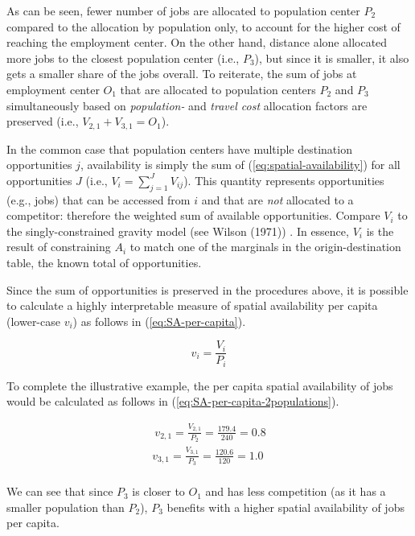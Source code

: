 \documentclass[]{elsarticle} %
\begin{document}
As can be seen, fewer number of jobs are allocated to population center
\(P_2\) compared to the allocation by population only, to account for
the higher cost of reaching the employment center. On the other hand,
distance alone allocated more jobs to the closest population center
(i.e., \(P_3\)), but since it is smaller, it also gets a smaller share
of the jobs overall. To reiterate, the sum of jobs at employment center
\(O_1\) that are allocated to population centers \(P_2\) and \(P_3\)
simultaneously based on \emph{population-} and \emph{travel cost}
allocation factors are preserved (i.e., \(V_{2,1} + V_{3,1} = O_1\)).

In the common case that population centers have multiple destination
opportunities \(j\), availability is simply the sum of
(\ref{eq:spatial-availability}) for all opportunities \(J\) (i.e.,
\(V_i = \sum_{j=1}^J V_{ij}\)). This quantity represents opportunities
(e.g., jobs) that can be accessed from \(i\) and that are \emph{not}
allocated to a competitor: therefore the weighted sum of available
opportunities. Compare \(V_i\) to the singly-constrained gravity model
(see Wilson (1971)) . In essence, \(V_i\) is the result of constraining
\(A_i\) to match one of the marginals in the origin-destination table,
the known total of opportunities.

Since the sum of opportunities is preserved in the procedures above, it
is possible to calculate a highly interpretable measure of spatial
availability per capita (lower-case \(v_i\)) as follows in
(\ref{eq:SA-per-capita}).

\begin{equation}
\label{eq:SA-per-capita}
v_i = \frac{V_i}{P_i}
\end{equation}

To complete the illustrative example, the per capita spatial
availability of jobs would be calculated as follows in
(\ref{eq:SA-per-capita-2populations}).

\begin{equation}
\label{eq:SA-per-capita-2populations}
\begin{array}{l}\
v_{2,1} = \frac{V_{2,1}}{P_2} =  \frac{179.4}{240} = 0.8\\
v_{3,1} =  \frac{V_{3,1}}{P_3} =  \frac{120.6}{120} = 1.0\\
\end{array}
\end{equation}

We can see that since \(P_3\) is closer to \(O_1\) and has less
competition (as it has a smaller population than \(P_2\)), \(P_3\)
benefits with a higher spatial availability of jobs per capita.
\end{document}
